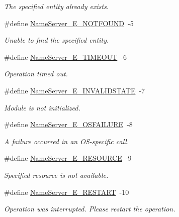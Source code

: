 \begin{DoxyCompactItemize}
\begin{DoxyCompactList}\small\item\em The specified entity already exists. \end{DoxyCompactList}\item 
\#define \hyperlink{_name_server_8h_a6af9a47d256473dbeb9653988603c36e}{Name\-Server\-\_\-\-E\-\_\-\-N\-O\-T\-F\-O\-U\-N\-D}~-\/5
\begin{DoxyCompactList}\small\item\em Unable to find the specified entity. \end{DoxyCompactList}\item 
\#define \hyperlink{_name_server_8h_a0f8f1fb04f719120e127565d2c3aaa5c}{Name\-Server\-\_\-\-E\-\_\-\-T\-I\-M\-E\-O\-U\-T}~-\/6
\begin{DoxyCompactList}\small\item\em Operation timed out. \end{DoxyCompactList}\item 
\#define \hyperlink{_name_server_8h_af8382f12ca225820d75eee0b5b48f57f}{Name\-Server\-\_\-\-E\-\_\-\-I\-N\-V\-A\-L\-I\-D\-S\-T\-A\-T\-E}~-\/7
\begin{DoxyCompactList}\small\item\em Module is not initialized. \end{DoxyCompactList}\item 
\#define \hyperlink{_name_server_8h_a1241686307312899fadce59ec251b237}{Name\-Server\-\_\-\-E\-\_\-\-O\-S\-F\-A\-I\-L\-U\-R\-E}~-\/8
\begin{DoxyCompactList}\small\item\em A failure occurred in an O\-S-\/specific call. \end{DoxyCompactList}\item 
\#define \hyperlink{_name_server_8h_afb9e082dbbf79808eb895db9b818e126}{Name\-Server\-\_\-\-E\-\_\-\-R\-E\-S\-O\-U\-R\-C\-E}~-\/9
\begin{DoxyCompactList}\small\item\em Specified resource is not available. \end{DoxyCompactList}\item 
\#define \hyperlink{_name_server_8h_acf390d38dd50b5ea5f4d58c6e892d8b6}{Name\-Server\-\_\-\-E\-\_\-\-R\-E\-S\-T\-A\-R\-T}~-\/10
\begin{DoxyCompactList}\small\item\em Operation was interrupted. Please restart the operation. \end{DoxyCompactList}\item 

\end{DoxyCompactItemize}
